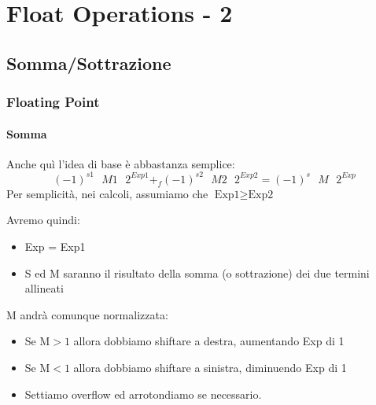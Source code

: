 \documentclass{beamer}
\begin{document}
  \section{Float Operations - 2}
  \subsection{Somma/Sottrazione}
  \begin{frame}
    \frametitle{Floating Point}
    \framesubtitle{Somma}
      Anche quì l'idea di base è abbastanza semplice:
      $$(-1)^{s1} \text{ } M1 \text{ } 2^{Exp1} +_{f} (-1)^{s2} \text{ } M2 \text{ } 2^{Exp2} = (-1)^{s} \text{ } M \text{ } 2^{Exp}$$
      Per semplicità, nei calcoli, assumiamo che $\text{Exp1} \geq \text{Exp2}$
      \vspace{2em}
      
      Avremo quindi:
      \begin{itemize}
      		\item Exp = Exp1
      		\item S ed M saranno il risultato della somma (o sottrazione) dei due termini allineati
      \end{itemize}
      
      \vspace{2em}
      M andrà comunque normalizzata:
      \begin{itemize}
      		\item Se M$>1$ allora dobbiamo shiftare a destra, aumentando Exp di 1
      		\item Se M$<1$ allora dobbiamo shiftare a sinistra, diminuendo Exp di 1
      		\item Settiamo overflow ed arrotondiamo se necessario.
      \end{itemize}
      
  \end{frame}
\end{document}
